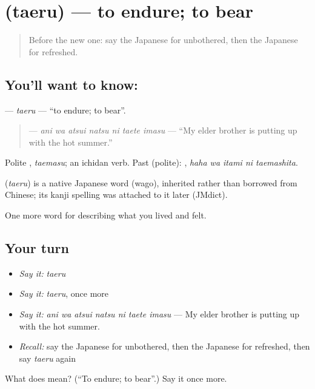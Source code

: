 \section[\texorpdfstring{\ja{たえる} (taeru)}{たえる (taeru)}]{ (taeru) — to endure; to bear}

\label{lesson:JA-C426-taeru}



\begin{quote}
Before the new one: say the Japanese for unbothered, then the Japanese for refreshed.
\end{quote}

\subsection*{You'll want to know: }
\textbf{} — \emph{taeru} — \textquotedblleft{}to endure; to bear\textquotedblright{}.

\begin{quote}
\textbf{   } — \emph{ani wa atsui natsu ni taete imasu} — \textquotedblleft{}My elder brother is putting up with the hot summer.\textquotedblright{}
\end{quote}

Polite \textbf{}, \emph{taemasu}; an ichidan verb. Past (polite): \textbf{  }, \emph{haha wa itami ni taemashita}.

\begin{cousinweb}
\textbf{} (\emph{taeru}) is a native Japanese word (wago), inherited rather than borrowed from Chinese; its kanji spelling was attached to it later (JMdict).
\end{cousinweb}

\begin{grammarlens}[title={What you've built}]
One more word for describing what you lived and felt.
\end{grammarlens}

\subsection*{Your turn}
\begin{itemize}
\raggedright
  \item \emph{Say it:} \emph{taeru}
  \item \emph{Say it:} \emph{taeru}, once more
  \item \emph{Say it:} \emph{ani wa atsui natsu ni taete imasu} — My elder brother is putting up with the hot summer.
  \item \emph{Recall:} say the Japanese for unbothered, then the Japanese for refreshed, then say \emph{taeru} again
\end{itemize}

\begin{tcolorbox}[breakable,colback=teal!4,colframe=teal!35!black,title={Before you move on}]
What does  mean? (\textquotedblleft{}To endure; to bear\textquotedblright{}.) Say it once more.
\end{tcolorbox}
